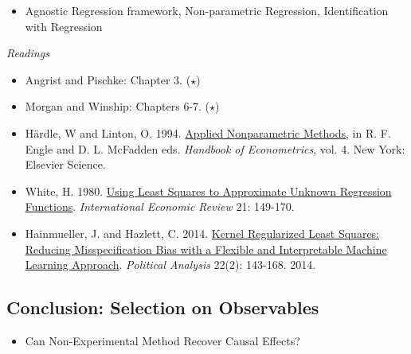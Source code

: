 \documentclass{article}
\begin{document}
\begin{itemize}
\item Agnostic Regression framework, Non-parametric Regression, Identification with Regression
\end{itemize}

\emph{Readings}
\begin{itemize}
\item  Angrist and Pischke: Chapter 3. ($\star$)
\item Morgan and Winship: Chapters 6-7. ($\star$)
\item H\"ardle, W and Linton, O. 1994.  \href{http://web.uconn.edu/tripathi/397/Applied%20nonparametric%20methods.pdf} {Applied Nonparametric Methods}, in R. F. Engle and D. L. McFadden eds. \textit{Handbook of Econometrics}, vol. 4. New York: Elsevier Science.
\item White, H. 1980.  \href{http://www.jstor.org/stable/2526245} {Using Least Squares to Approximate Unknown Regression Functions}. \textit{International Economic Review} 21: 149-170.
\item Hainmueller, J. and Hazlett, C. 2014. \href{http://pan.oxfordjournals.org/content/early/2013/10/10/pan.mpt019}{Kernel Regularized Least Squares: Reducing Misspecification Bias with a Flexible and Interpretable Machine Learning Approach}. \textit{Political Analysis} 22(2): 143-168.
2014.
\end{itemize}

\subsection{Conclusion: Selection on Observables}

\begin{itemize}
\item Can Non-Experimental Method Recover Causal Effects?
\end{itemize}
\end{document}
